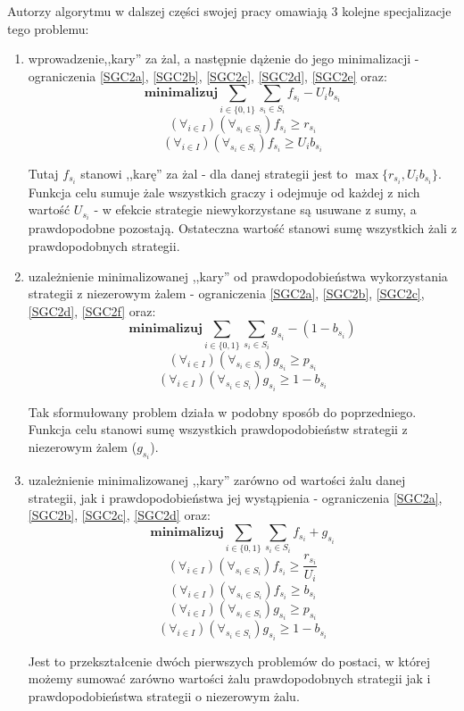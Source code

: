 \documentclass[polish]{standalone}
\begin{document}
Autorzy algorytmu w dalszej części swojej pracy omawiają 3 kolejne specjalizacje tego problemu:
\begin{enumerate}
\item wprowadzenie,,kary'' za żal, a następnie dążenie do jego minimalizacji - ograniczenia \ref{SGC2a},
\ref{SGC2b}, \ref{SGC2c}, \ref{SGC2d}, \ref{SGC2e} oraz:
$$\textbf{minimalizuj} \sum_{i \in \{0,1\}} \sum_{s_i \in S_i} f_{s_i} - U_i b_{s_i}$$
$$(\forall_{i \in I}) (\forall_{s_i \in S_i}) f_{s_i} \geq r_{s_i}$$
$$(\forall_{i \in I}) (\forall_{s_i \in S_i}) f_{s_i} \geq U_i b_{s_i}$$
\cite[str.~2]{SCG-NE}

Tutaj $f_{s_i}$ stanowi ,,karę'' za żal - dla danej strategii jest to $\max \{ r_{s_i}, U_i b_{s_i} \}$. Funkcja celu
sumuje żale wszystkich graczy i odejmuje od każdej z nich wartość $U_{s_i}$ - w efekcie strategie niewykorzystane są
usuwane z sumy, a prawdopodobne pozostają. Ostateczna wartość stanowi sumę wszystkich żali z prawdopodobnych strategii.

\item uzależnienie minimalizowanej ,,kary'' od prawdopodobieństwa wykorzystania strategii z niezerowym żalem
- ograniczenia \ref{SGC2a}, \ref{SGC2b}, \ref{SGC2c}, \ref{SGC2d}, \ref{SGC2f} oraz:
$$\textbf{minimalizuj} \sum_{i \in \{0,1\}} \sum_{s_i \in S_i} g_{s_i} - (1 - b_{s_i})$$
$$(\forall_{i \in I}) (\forall_{s_i \in S_i}) g_{s_i} \geq p_{s_i}$$
$$(\forall_{i \in I}) (\forall_{s_i \in S_i}) g_{s_i} \geq 1 - b_{s_i}$$
\cite[str.~2]{SCG-NE}

Tak sformułowany problem działa w podobny sposób do poprzedniego. Funkcja celu stanowi sumę wszystkich
prawdopodobieństw strategii z niezerowym żalem ($g_{s_i}$).

\item uzależnienie minimalizowanej ,,kary'' zarówno od wartości żalu danej strategii, jak i prawdopodobieństwa jej
wystąpienia - ograniczenia \ref{SGC2a}, \ref{SGC2b}, \ref{SGC2c}, \ref{SGC2d} oraz:
$$\textbf{minimalizuj} \sum_{i \in \{0,1\}} \sum_{s_i \in S_i} f_{s_i} + g_{s_i}$$
$$(\forall_{i \in I}) (\forall_{s_i \in S_i}) f_{s_i} \geq \frac{r_{s_i}}{U_i}$$
$$(\forall_{i \in I}) (\forall_{s_i \in S_i}) f_{s_i} \geq b_{s_i}$$
$$(\forall_{i \in I}) (\forall_{s_i \in S_i}) g_{s_i} \geq p_{s_i}$$
$$(\forall_{i \in I}) (\forall_{s_i \in S_i}) g_{s_i} \geq 1 - b_{s_i}$$
\cite[str.~2--3]{SCG-NE}

Jest to przekształcenie dwóch pierwszych problemów do postaci, w której możemy sumować zarówno wartości żalu
prawdopodobnych strategii jak i prawdopodobieństwa strategii o niezerowym żalu.
\end{enumerate}
\end{document}
